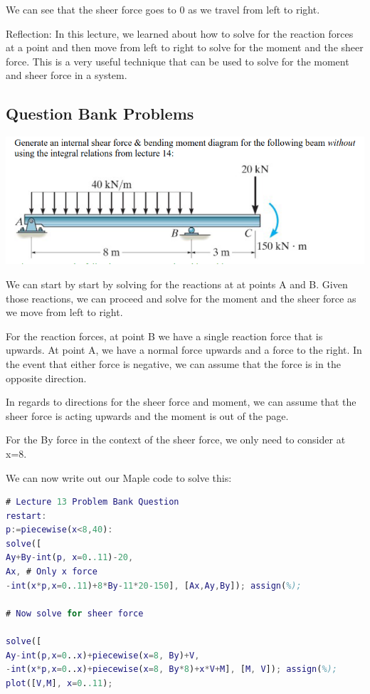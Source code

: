 \documentclass{article}[14pt, letterpaper, Times New Roman]
\begin{document}
We can see that the sheer force goes to 0 as we travel from left to right.

\medskip

Reflection: In this lecture, we learned about how to solve for the reaction forces at a point and then move from left to right to solve for the moment and the sheer force. This is a very useful technique that can be used to solve for the moment and sheer force in a system.

\subsection{Question Bank Problems}

\includegraphics[width=15cm]{l13-pbq.png}

We can start by start by solving for the reactions at at points A and B.
Given those reactions, we can proceed and solve for the moment and the sheer force as we move from left to right.

For the reaction forces, at point B we have a single reaction force that is upwards.
At point A, we have a normal force upwards and a force to the right.
In the event that either force is negative, we can assume that the force is in the opposite direction.

In regards to directions for the sheer force and moment, we can assume that the sheer force is acting upwards and the moment is out	of the page.

For the By force in the context of the sheer force, we only need to consider at x=8.

We can now write out our Maple code to solve this:

\begin{lstlisting}[language=matlab]
# Lecture 13 Problem Bank Question
restart:
p:=piecewise(x<8,40):
solve([
Ay+By-int(p, x=0..11)-20,
Ax, # Only x force
-int(x*p,x=0..11)+8*By-11*20-150], [Ax,Ay,By]); assign(%);

# Now solve for sheer force

solve([
Ay-int(p,x=0..x)+piecewise(x=8, By)+V,
-int(x*p,x=0..x)+piecewise(x=8, By*8)+x*V+M], [M, V]); assign(%);
plot([V,M], x=0..11);
\end{lstlisting}
\end{document}
